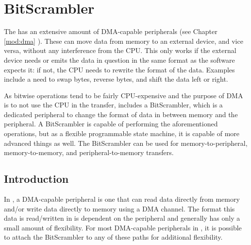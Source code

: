 \documentclass[main\_\_EN.tex]{subfiles}
\begin{document}

\ifglobal
\else
    \listoftodos
    {\let\clearpage\relax \listofdonetodos}
    \tableofcontents
\fi



\hypertarget{bitscrm}{}
\chapter{BitScrambler}
\label{mod:bitscrm}



The \chipname{} has an extensive amount of DMA-capable peripherals (see Chapter \ref{mod:dma} \textit{}). These can move data from memory to an external device, and vice versa, without any interference from the CPU. This only works if the external device needs or emits the data in question in the same format as the software expects it: if not, the CPU needs to rewrite the format of the data. Examples include a need to swap bytes, reverse bytes, and shift the data left or right.

As bitwise operations tend to be fairly CPU-expensive and the purpose of DMA is to not use the CPU in the transfer, \chipname{} includes a BitScrambler, which is a dedicated peripheral to change the format of data in between memory and the peripheral. A BitScrambler is capable of performing the aforementioned operations, but as a flexible programmable state machine, it is capable of more advanced things as well. The BitScrambler can be used for memory-to-peripheral,  memory-to-memory, and peripheral-to-memory  transfers.



\section{Introduction}

In \chipname{}, a DMA-capable peripheral is one that can read data directly from memory and/or write data directly to memory using a DMA channel. The format this data is read/written in is dependent on the peripheral and generally has only a small amount of flexibility. For most DMA-capable peripherals in \chipname{}, it is possible to attach the BitScrambler to any of these paths for additional flexibility.
\end{document}
